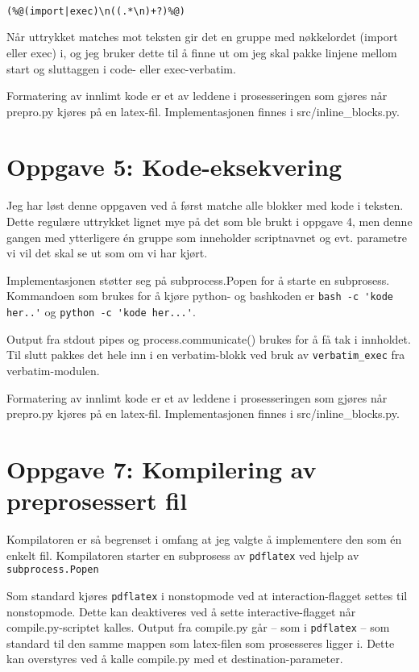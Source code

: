 \documentclass{article}
\renewenvironment{shadedwbar}{
\def\FrameCommand{\color[rgb]{0.7,     0.95686, 1}\vrule width 1mm\normalcolor\colorbox{shadecolor}}\FrameRule0.6pt
\MakeFramed {\advance\hsize-2mm\FrameRestore}\vskip3mm}{\vskip0mm\endMakeFramed}
\renewenvironment{shadedquoteBlueBar}[1][]{
\bgroup\rmfamily
\fboxsep=0mm\relax
\begin{shadedwbar}
\list{}{\parsep=-2mm\parskip=0mm\topsep=0pt\leftmargin=2mm
\rightmargin=2\leftmargin\leftmargin=4pt\relax}
\item\relax}
{\endlist\end{shadedwbar}\egroup}
\begin{document}
\begin{shadedquoteBlueBar}
\fontsize{9pt}{9pt}
\begin{Verbatim}

(%@(import|exec)\n((.*\n)+?)%@)
\end{Verbatim}
\end{shadedquoteBlueBar}
\noindent


Når uttrykket matches mot teksten gir det en gruppe med nøkkelordet (import eller exec) i, og jeg bruker dette til å finne ut om jeg skal pakke linjene mellom start og sluttaggen i code- eller exec-verbatim.

Formatering av innlimt kode er et av leddene i prosesseringen som gjøres når prepro.py kjøres på en latex-fil. Implementasjonen finnes i src/inline\_blocks.py.

\section*{Oppgave 5: Kode-eksekvering}

Jeg har løst denne oppgaven ved å først matche alle blokker med kode i teksten. Dette regulære uttrykket lignet mye på det som ble brukt i oppgave 4, men denne gangen med ytterligere én gruppe som inneholder scriptnavnet og evt. parametre vi vil det skal se ut som om vi har kjørt.

Implementasjonen støtter seg på subprocess.Popen for å starte en subprosess. Kommandoen som brukes for å kjøre python- og bashkoden er \verb;bash -c 'kode her..'; og \verb;python -c 'kode her...';.

Output fra stdout pipes og process.communicate() brukes for å få tak i innholdet. Til slutt pakkes det hele inn i en verbatim-blokk ved bruk av \verb;verbatim_exec; fra verbatim-modulen.

Formatering av innlimt kode er et av leddene i prosesseringen som gjøres når prepro.py kjøres på en latex-fil. Implementasjonen finnes i src/inline\_blocks.py.

\section*{Oppgave 7: Kompilering av preprosessert fil}

Kompilatoren er så begrenset i omfang at jeg valgte å implementere den som én enkelt fil. Kompilatoren starter en subprosess av \verb;pdflatex; ved hjelp av \verb;subprocess.Popen;

Som standard kjøres \verb;pdflatex; i nonstopmode ved at interaction-flagget settes til nonstopmode. Dette kan deaktiveres ved å sette interactive-flagget når compile.py-scriptet kalles.
Output fra compile.py går – som i \verb;pdflatex; – som standard til den samme mappen som latex-filen som prosesseres ligger i. Dette kan overstyres ved å kalle compile.py med et destination-parameter.
\end{document}
